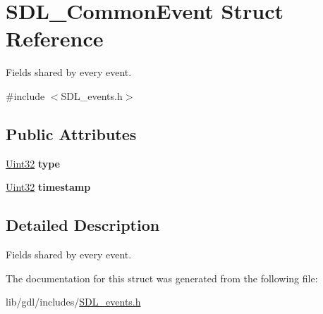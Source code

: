 \hypertarget{struct_s_d_l___common_event}{}\section{S\+D\+L\+\_\+\+Common\+Event Struct Reference}
\label{struct_s_d_l___common_event}


Fields shared by every event.  




{\ttfamily \#include $<$S\+D\+L\+\_\+events.\+h$>$}

\subsection*{Public Attributes}
\begin{DoxyCompactItemize}
\item 
\hypertarget{struct_s_d_l___common_event_a4ecd888325355321b42b2e2956f27453}{}\hyperlink{_s_d_l__stdinc_8h_add440eff171ea5f55cb00c4a9ab8672d}{Uint32} {\bfseries type}\label{struct_s_d_l___common_event_a4ecd888325355321b42b2e2956f27453}

\item 
\hypertarget{struct_s_d_l___common_event_a7d9046abb021ffc88dd5d32978289e65}{}\hyperlink{_s_d_l__stdinc_8h_add440eff171ea5f55cb00c4a9ab8672d}{Uint32} {\bfseries timestamp}\label{struct_s_d_l___common_event_a7d9046abb021ffc88dd5d32978289e65}

\end{DoxyCompactItemize}


\subsection{Detailed Description}
Fields shared by every event. 

The documentation for this struct was generated from the following file\+:\begin{DoxyCompactItemize}
\item 
lib/gdl/includes/\hyperlink{_s_d_l__events_8h}{S\+D\+L\+\_\+events.\+h}\end{DoxyCompactItemize}

